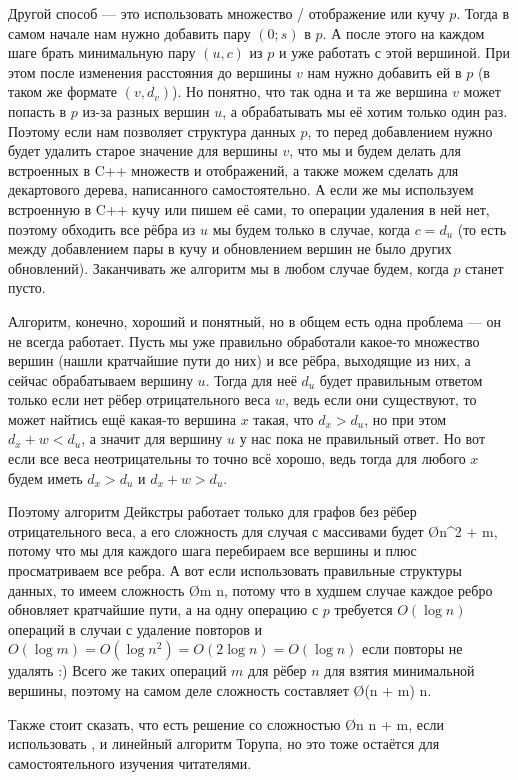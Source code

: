 Другой способ — это использовать множество / отображение или кучу $p$. Тогда в самом начале нам нужно добавить пару $(0; s)$ в $p$. А после этого на каждом шаге брать минимальную пару $(u, c)$ из $p$ и уже работать с этой вершиной. При этом после изменения расстояния до вершины $v$ нам нужно добавить ей в $p$ (в таком же формате $(v, d_v)$). Но понятно, что так одна и та же вершина $v$ может попасть в $p$ из-за разных вершин $u$, а обрабатывать мы её хотим только один раз. Поэтому если нам позволяет структура данных $p$, то перед добавлением нужно будет удалить старое значение для вершины $v$, что мы и будем делать для встроенных в C++ множеств и отображений, а также можем сделать для декартового дерева, написанного самостоятельно. А если же мы используем встроенную в C++ кучу или пишем её сами, то операции удаления в ней нет, поэтому обходить все рёбра из $u$ мы будем только в случае, когда $c = d_u$ (то есть между добавлением пары в кучу и обновлением вершин не было других обновлений). Заканчивать же алгоритм мы в любом случае будем, когда $p$ станет пусто.

Алгоритм, конечно, хороший и понятный, но в общем есть одна проблема — он не всегда работает. Пусть мы уже правильно обработали какое-то множество вершин (нашли кратчайшие пути до них) и все рёбра, выходящие из них, а сейчас обрабатываем вершину $u$. Тогда для неё $d_u$ будет правильным ответом только если нет рёбер отрицательного веса $w$, ведь если они существуют, то может найтись ещё какая-то вершина $x$ такая, что $d_x > d_u$, но при этом $d_x + w < d_u$, а значит для вершину $u$ у нас пока не правильный ответ. Но вот если все веса неотрицательны то точно всё хорошо, ведь тогда для любого $x$ будем иметь $d_x > d_u$ и $d_x + w > d_u$.

Поэтому алгоритм Дейкстры работает только для графов без рёбер отрицательного веса, а его сложность для случая с массивами будет \O{n^2 + m}, потому что мы для каждого шага перебираем все вершины и плюс просматриваем все ребра. А вот если использовать правильные структуры данных, то имеем сложность \O{m \log n}, потому что в худшем случае каждое ребро обновляет кратчайшие пути, а на одну операцию с $p$ требуется $O(\log n)$ операций в случаи с удаление повторов и $O(\log m) = O(\log n^2) = O(2 \log n) = O(\log n)$ если повторы не удалять :) Всего же таких операций $m$ для рёбер 
$n$ для взятия минимальной вершины, поэтому на самом деле сложность составляет \O{(n + m) \log n}.

Также стоит сказать, что есть решение со сложностью \O{n \log n + m}, если использовать , и линейный алгоритм Торупа, но это тоже остаётся для самостоятельного изучения читателями.

